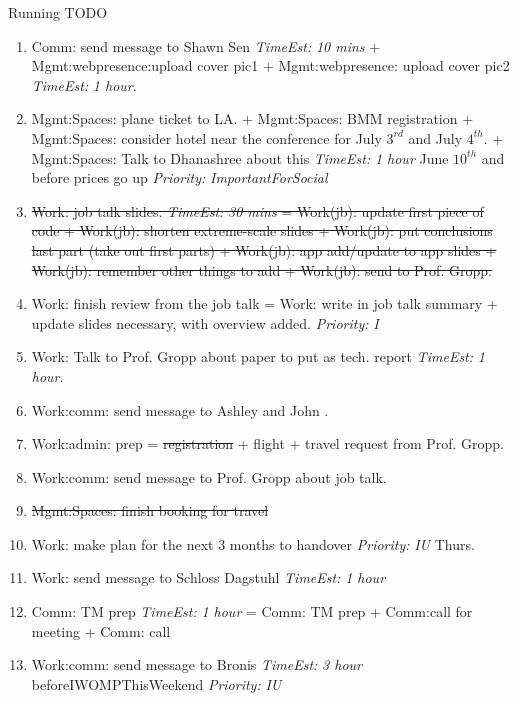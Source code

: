 \documentclass[serif, mathserif, final]{beamer}
\newcommand{\doneTaskNoItem}[1]{\sout{#1}}
\newcommand{\doneTask}[1]{\tiny \item \tiny \sout{#1}}
\newcommand{\te}[1]{\textit{TimeEst:} \textit{#1}}
\newcommand{\priority}[1]{\textit{Priority:} \textit{#1}}
\newcommand{\prio}[1]{\textit{Priority:} \textit{#1}}
\newcommand{\dl}[1]{#1}
\begin{document}
\begin{frame}{}
\begin{columns}
\begin{column}{0.50\linewidth}
\begin{block}{Running TODO}
\begin{enumerate}
      \item \small Comm: send message to Shawn Sen \te{10 mins} +
        Mgmt:webpresence:upload cover pic1 + Mgmt:webpresence: upload
        cover pic2 \te{1 hour}. 
      \item \small Mgmt:Spaces: plane ticket to LA.  + Mgmt:Spaces:
        BMM registration + Mgmt:Spaces: consider hotel near the
        conference for July $3^{rd}$ and July $4^{th}$.  +
        Mgmt:Spaces: Talk to Dhanashree about this \te{1 hour}
        \dl{June $10^{th}$ and before prices go up}
        \prio{ImportantForSocial} 

      \doneTask{ Work: job talk slides. \te{30 mins} =  Work(jb):
        update first piece of code  + Work(jb): shorten extreme-scale
        slides + Work(jb): put conclusions last part (take out first
        parts) + Work(jb): app add/update to app slides + Work(jb):
       remember other things to add + Work(jb): send to Prof. Gropp.}

    \item \small Work: finish review from the job talk  = Work:
      write in job talk summary + update slides necessary, with
      overview added. \priority{I} 
      
    \item \small Work: Talk to Prof. Gropp about paper to put as
      tech. report \te{1 hour}. 
        
    \item \small Work:comm: send message to Ashley and John . 
 
   \item \small Work:admin: prep = \doneTaskNoItem{registration} +
      flight + travel request from Prof. Gropp.  
    \item \small Work:comm: send message to Prof. Gropp about job
      talk. 

      \doneTask{Mgmt:Spaces: finish booking for travel} 

    \item \small Work: make plan for the next 3 months to handover
      \priority{IU} \dl{Thurs}.

    \item \small Work: send message to Schloss Dagstuhl \te{1 hour} 
    \item \small Comm: TM prep \te{1 hour} = Comm: TM prep + Comm:call
      for meeting + Comm: call


    \item \small Work:comm: send message to Bronis \te{3  hour} \dl
      {beforeIWOMPThisWeekend} \priority{IU}


\end{enumerate}
\end{block}
\end{column}
\end{columns}
\end{frame}
\end{document}
